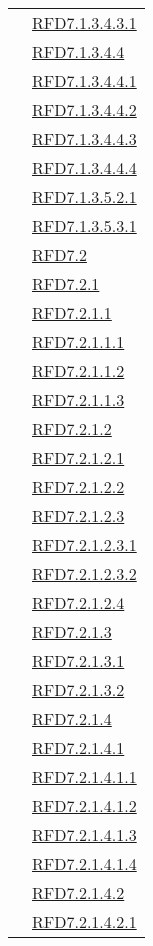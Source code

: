 \begin{longtable}{|>{\centering}m{5cm}|m{5cm}<{\centering}|}
& \hyperlink{RFD7.1.3.4.3.1}{RFD7.1.3.4.3.1}\\
& \hyperlink{RFD7.1.3.4.4}{RFD7.1.3.4.4}\\
& \hyperlink{RFD7.1.3.4.4.1}{RFD7.1.3.4.4.1}\\
& \hyperlink{RFD7.1.3.4.4.2}{RFD7.1.3.4.4.2}\\
& \hyperlink{RFD7.1.3.4.4.3}{RFD7.1.3.4.4.3}\\
& \hyperlink{RFD7.1.3.4.4.4}{RFD7.1.3.4.4.4}\\
& \hyperlink{RFD7.1.3.5.2.1}{RFD7.1.3.5.2.1}\\
& \hyperlink{RFD7.1.3.5.3.1}{RFD7.1.3.5.3.1}\\
& \hyperlink{RFD7.2}{RFD7.2}\\
& \hyperlink{RFD7.2.1}{RFD7.2.1}\\
& \hyperlink{RFD7.2.1.1}{RFD7.2.1.1}\\
& \hyperlink{RFD7.2.1.1.1}{RFD7.2.1.1.1}\\
& \hyperlink{RFD7.2.1.1.2}{RFD7.2.1.1.2}\\
& \hyperlink{RFD7.2.1.1.3}{RFD7.2.1.1.3}\\
& \hyperlink{RFD7.2.1.2}{RFD7.2.1.2}\\
& \hyperlink{RFD7.2.1.2.1}{RFD7.2.1.2.1}\\
& \hyperlink{RFD7.2.1.2.2}{RFD7.2.1.2.2}\\
& \hyperlink{RFD7.2.1.2.3}{RFD7.2.1.2.3}\\
& \hyperlink{RFD7.2.1.2.3.1}{RFD7.2.1.2.3.1}\\
& \hyperlink{RFD7.2.1.2.3.2}{RFD7.2.1.2.3.2}\\
& \hyperlink{RFD7.2.1.2.4}{RFD7.2.1.2.4}\\
& \hyperlink{RFD7.2.1.3}{RFD7.2.1.3}\\
& \hyperlink{RFD7.2.1.3.1}{RFD7.2.1.3.1}\\
& \hyperlink{RFD7.2.1.3.2}{RFD7.2.1.3.2}\\
& \hyperlink{RFD7.2.1.4}{RFD7.2.1.4}\\
& \hyperlink{RFD7.2.1.4.1}{RFD7.2.1.4.1}\\
& \hyperlink{RFD7.2.1.4.1.1}{RFD7.2.1.4.1.1}\\
& \hyperlink{RFD7.2.1.4.1.2}{RFD7.2.1.4.1.2}\\
& \hyperlink{RFD7.2.1.4.1.3}{RFD7.2.1.4.1.3}\\
& \hyperlink{RFD7.2.1.4.1.4}{RFD7.2.1.4.1.4}\\
& \hyperlink{RFD7.2.1.4.2}{RFD7.2.1.4.2}\\
& \hyperlink{RFD7.2.1.4.2.1}{RFD7.2.1.4.2.1}\\

\end{longtable}
